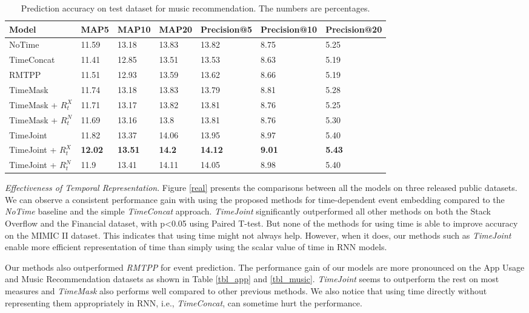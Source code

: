 \documentclass{article} %
\begin{document}
\begin{table}[h!]
   \caption{Prediction accuracy on test dataset for music recommendation. The numbers are percentages.\label{tbl_music}}
   \label{sample-table}
   \centering
   \begin{tabular}{lllllll}
     \toprule
     \cmidrule{1-2}
     Model & MAP5 & MAP10 & MAP20 & Precision@5 & Precision@10 & Precision@20 \\
     \midrule
     NoTime & 11.59 &	13.18 & 13.83 &	13.82 & 8.75 &	5.25 \\
     TimeConcat & 11.41 &	12.85 &	13.51 &	13.53 &	8.63 &	5.19 \\
     RMTPP & 11.51 & 12.93 & 13.59 & 13.62 & 8.66 & 5.19 \\
     TimeMask & 11.74 &	13.18 & 13.83 &	13.79 &	8.81 & 5.28  \\
     TimeMask + $R_{t}^X$ & 11.71 & 13.17 & 13.82 & 13.81 & 8.76 &	5.25 \\
     TimeMask + $R_{t}^N$ & 11.69 & 13.16 & 13.8 & 13.81 & 8.76 &	5.30 \\
     TimeJoint & 11.82 & 13.37 & 14.06 & 13.95 &	8.97 & 5.40  \\
     TimeJoint + $R_{t}^X$ & \textbf{12.02} & \textbf{13.51} & \textbf{14.2} & \textbf{14.12} & \textbf{9.01} & \textbf{5.43} \\
     TimeJoint + $R_{t}^N$ & 11.9 &	13.41 & 14.11 & 14.05 & 8.98 &	5.40 \\
     \bottomrule
   \end{tabular}
\end{table}

\emph{Effectiveness of Temporal Representation}. Figure \ref{real} presents the comparisons between all the models on three released public datasets. We can observe a consistent performance gain with using the proposed methods for time-dependent event embedding compared to the \emph{NoTime} baseline and the simple \emph{TimeConcat} approach. \emph{TimeJoint} significantly outperformed all other methods on both the Stack Overflow and the Financial dataset, with p<0.05 using Paired T-test. But none of the methods for using time is able to improve accuracy on the MIMIC II dataset.  This indicates that using time might not always help. However, when it does, our methods such as \emph{TimeJoint} enable more efficient representation of time than simply using the scalar value of time in RNN models.

Our methods also outperformed \emph{RMTPP} for event prediction. The performance gain of our models are more pronounced on the App Usage and Music Recommendation datasets as shown in Table \ref{tbl_app} and \ref{tbl_music}. \emph{TimeJoint} seems to outperform the rest on most measures and \emph{TimeMask} also performs well compared to other previous methods. We also notice that using time directly without representing them appropriately in RNN, i.e., \emph{TimeConcat}, can sometime hurt the performance.
\end{document}
